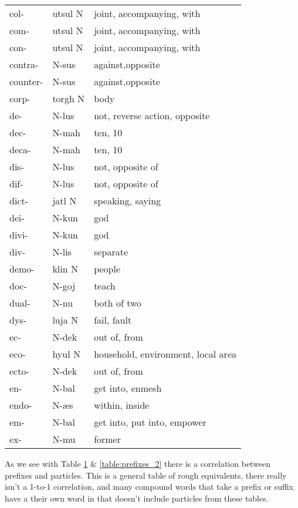 \begin{table}[ht]
\begin{tabular}{ l l l }
		col- & utsul N & joint, accompanying, with \\
		com- & utsul N & joint, accompanying, with \\
		con- & utsul N & joint, accompanying, with \\
		contra- & N-sus & against,opposite \\
		counter- & N-sus & against,opposite \\
		corp- & torgh N & body \\
		de- & N-lus & not, reverse action, opposite \\
		dec- & N-mah & ten, 10 \\
		deca- & N-mah & ten, 10 \\
		dis- & N-lus & not, opposite of \\
		dif- & N-lus & not, opposite of \\
		dict- & jatl N & speaking, saying \\
		dei- & N-kun & god \\
		divi- & N-kun & god \\
		div- & N-lis & separate \\
		demo- & klin N & people \\
		doc- & N-goj & teach \\
		dual- & N-nu & both of two \\
		dys- & luja N & fail, fault \\
		ec- & N-dek & out of, from \\
		eco- & hyul N & household, environment, local area \\
		ecto- & N-dek & out of, from \\
		en- & N-bal & get into, enmesh \\
		endo- & N-æs & within, inside \\
		em- & N-bal & get into, put into, empower \\
		ex- & N-mu & former \\
		\bottomrule
	\end{tabular}
	\label{table:prefixes_1}
\end{table}

As we see with Table \ref{table:prefixes_1} \& \ref{table:prefixes_2} there is a correlation between \english prefixes and \klingon particles. This is a general table of rough equivalents, there really isn't a 1-to-1 correlation, and many compound \english words that take a prefix or suffix have a their own word in \klingon that doesn't include particles from these tables.

